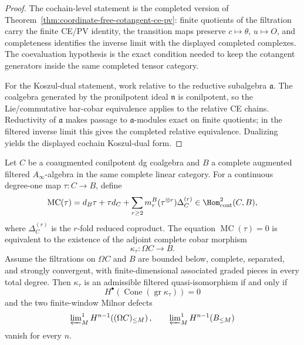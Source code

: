 \documentclass[11pt]{memoir}
\begin{document}
\begin{proof}
  The cochain-level statement is the completed version of
  Theorem~\ref{thm:coordinate-free-cotangent-ce-pv}: finite quotients of
  the filtration carry the finite CE/PV identity, the transition maps
  preserve \(c\mapsto\theta\), \(u\mapsto O\), and completeness
  identifies the inverse limit with the displayed completed complexes.
  The coevaluation hypothesis is the exact condition needed to keep the
  cotangent generators inside the same completed tensor category.

  For the Koszul-dual statement, work relative to the reductive
  subalgebra \(\mathfrak a\).  The coalgebra generated by the
  pronilpotent ideal \(\mathfrak n\) is conilpotent, so the
  Lie/commutative bar-cobar equivalence applies to the relative CE
  chains.  Reductivity of \(\mathfrak a\) makes passage to
  \(\mathfrak a\)-modules exact on finite quotients; in the filtered
  inverse limit this gives the completed relative equivalence.
  Dualizing yields the displayed cochain Koszul-dual form.
\end{proof}

\begin{lem}\label{lem:filtered-cobar-qiso-criterion}
  Let \(C\) be a coaugmented conilpotent dg coalgebra and \(B\) a
  complete augmented filtered \(A_\infty\)-algebra in the same complete
  linear category.  For a continuous degree-one map
  \(\tau\colon C\to B\), define
  \[
    \operatorname{MC}(\tau)
      =
      d_B\tau+\tau d_C
      +\sum_{r\geq2}m_r^B(\tau^{\otimes r})\Delta_C^{(r)}
      \in\Hom^2_{\mathrm{cont}}(C,B),
  \]
  where \(\Delta_C^{(r)}\) is the \(r\)-fold reduced coproduct.  The
  equation \(\operatorname{MC}(\tau)=0\) is equivalent to the existence
  of the adjoint complete cobar morphism
  \[
    \kappa_\tau\colon\Omega C\longrightarrow B .
  \]
  Assume the filtrations on \(\Omega C\) and \(B\) are bounded below,
  complete, separated, and strongly convergent, with
  finite-dimensional associated graded pieces in every total degree.
  Then \(\kappa_\tau\) is an admissible filtered
  quasi-isomorphism if and only if
  \[
    H^\bullet\!\left(\operatorname{Cone}(
      \operatorname{gr}\kappa_\tau)\right)=0
  \]
  and the two finite-window Milnor defects
  \[
    \varprojlim\nolimits^1_M
      H^{n-1}\!\left((\Omega C)_{\leq M}\right),
    \qquad
    \varprojlim\nolimits^1_M
      H^{n-1}\!\left(B_{\leq M}\right)
  \]
  vanish for every \(n\).
\end{lem}
\end{document}
